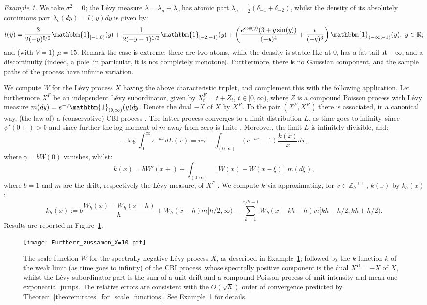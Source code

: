 \documentclass[pdftex,oneside,11pt,reqno]{amsart}
\theoremstyle{definition}
\theoremstyle{theorem}
\theoremstyle{remark}
\newtheorem{example}{Example}[section]
\numberwithin{equation}{section}
\numberwithin{definition}{section}
\begin{document}
\begin{example}\label{example:main}
We take ${\sigma^2}=0$; the L\'evy measure ${\lambda}={\lambda}_a+{\lambda}_c$ has atomic part ${\lambda}_a=\frac{1}{2}\left(\delta_{-1}+\delta_{-2}\right)$, whilst the density of its absolutely continuous part ${\lambda}_c(dy)=l(y)dy$ is given by: \footnotesize$$l(y)=\frac{3}{2(-y)^{5/2}}\mathbbm{1}_{[-1,0)}(y)+\frac{1}{2(-y-1)^{1/2}}\mathbbm{1}_{[-2,-1)}(y)+\left(\frac{e^{\cos(y)}(3+y\sin(y))}{(-y)^4}+\frac{e}{(-y)^3}\right)\mathbbm{1}_{(-\infty,-1)}(y),\ y\in \mathbb{R};$$ \normalsize and (with $V=1$) $\mu=15$. Remark 
the case is extreme: there are two atoms, while the density is stable-like at $0$, has a fat tail at $-\infty$, and a discontinuity (indeed, a pole; in particular, it is not completely monotone). Furthermore, there is no Gaussian component, and the sample paths of the process have infinite variation. 

We compute ${W}$ for the L\'evy process $X$ having the above characteristic triplet, and complement this with the following application. Let furthermore $X^F$ be an independent L\'evy subordinator, given by $X^F_t=t+Z_t$, $t\in [0,\infty)$, where $Z$ is a compound Poisson process with L\'evy measure $m(dy)=e^{-y}\mathbbm{1}_{(0,\infty)}(y)dy$. Denote the dual $-X$ of $X$ by $X^R$. To the pair $(X^F,X^R)$ there is associated, in a canonical way, (the law of) a (conservative) CBI process \cite{kawazu_watanabe}. The latter process converges to a limit distribution $L$, as time goes to infinity, since $\psi'(0+)>0$ \cite[Theorem~2.6(c)]{keller_mijatovic} and since further the log-moment of $m$ away from zero is finite \cite[Corollary~2.8]{keller_mijatovic}. Moreover, the limit $L$ is infinitely divisible, and: $$-\log\int_0^\infty e^{-ux}dL(x)=u\gamma-\int_{(0,\infty)}(e^{-ux}-1)\frac{k(x)}{x}dx,$$ where $\gamma=b{W}(0)$ vanishes, whilst: $$k(x)=b{W}'(x+)+\int_{(0,\infty)}[{W}(x)-{W}(x-\xi)]m(d\xi),$$ where $b=1$ and $m$ are the drift, respectively the L\'evy measure, of $X^F$ \cite[Theorem~3.1]{keller_mijatovic}. We compute $k$ via approximating, for $x\in {\mathbb{Z}_h}^{++}$, $k(x)$ by $k_h(x)$: $$k_h(x):=b\frac{{W}_h(x)-{W}_h(x-h)}{h}+{W}_h(x-h)m[h/2,\infty)-\sum_{k=1}^{x/h-1}{W}_h(x-kh-h)m[kh-h/2,kh+h/2).$$ Results are reported in Figure~\ref{figure:example:main}.
\end{example}

\begin{figure}
                \texttt{[image: Furtherr\_zussamen\_X=10.pdf]}
        \caption{The scale function ${W}$ for the spectrally negative L\'evy process $X$, as described in Example~\ref{example:main}; followed by the $k$-function $k$ of the weak limit (as time goes to infinity) of the CBI process, whose spectrally positive component is the dual $X^R=-X$ of $X$, whilst the L\'evy subordinator part is the sum of a unit drift and a compound Poisson process of unit intensity and mean one exponential jumps.  The relative errors are consistent with the $O(\sqrt{h})$ order of convergence predicted by Theorem~\ref{theorem:rates_for_scale_functions}. See Example~\ref{example:main} for details.
}\label{figure:example:main}
\end{figure}
\end{document}
